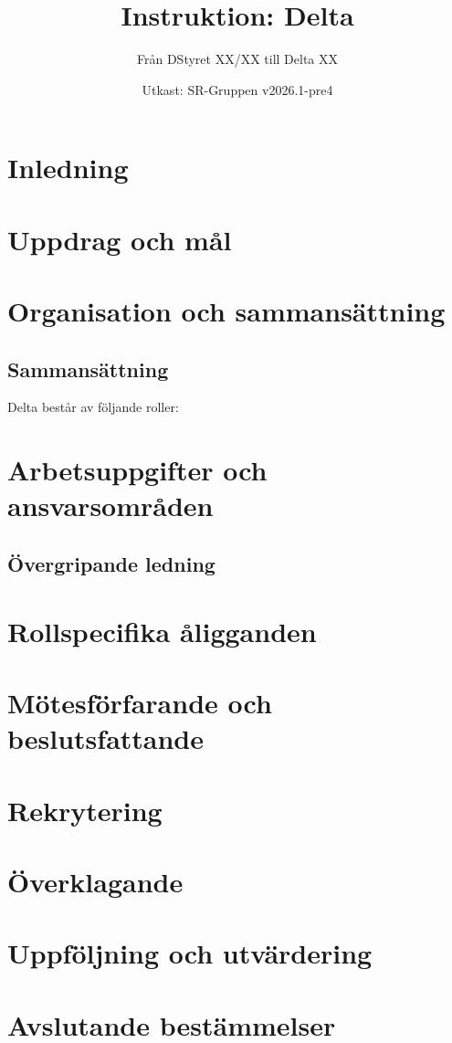 \documentclass[a4paper]{dtekinstruktion}
\title{Instruktion: Delta}
\subtitle{Från DStyret XX/XX till Delta XX}
\date{Utkast: SR-Gruppen v2026.1-pre4}
\begin{document}
\makeheadfoot

\setcounter{tocdepth}{2}
\tableofcontents

\section{Inledning}

\section{Uppdrag och mål}

\section{Organisation och sammansättning}
\subsection{Sammansättning}
Delta består av följande roller:

\section{Arbetsuppgifter och ansvarsområden}
\subsection{Övergripande ledning}

\section{Rollspecifika åligganden}


\section{Mötesförfarande och beslutsfattande}

\section{Rekrytering}

\section{Överklagande}
\section{Uppföljning och utvärdering}

\section{Avslutande bestämmelser}
\end{document}
